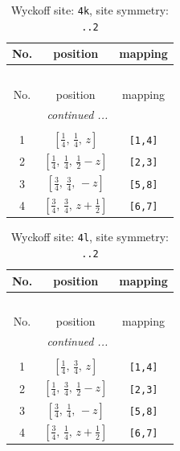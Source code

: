 \documentclass[fleqn,8pt]{jsarticle}
\begin{document}
\renewcommand{\arraystretch}{1.2}
\begin{longtable}{ccc}
\caption{Wyckoff site: {\tt 4k}, site symmetry: {\tt ..2}}
 \\
 \hline \hline
No. & position & mapping \\ \hline \endfirsthead

\multicolumn{2}{l}{\tablename\ \thetable{}} \\
 \hline \hline
No. & position & mapping \\ \hline \endhead

 \hline \hline
\multicolumn{2}{r}{\footnotesize\it continued ...} \\ \endfoot

 \hline \hline
\multicolumn{2}{r}{} \\ \endlastfoot

1 & $\left[ \frac{1}{4},\, \frac{1}{4},\, z \right]$ & {\tt [1,4]} \\ \hline
2 & $\left[ \frac{1}{4},\, \frac{1}{4},\, \frac{1}{2} - z \right]$ & {\tt [2,3]} \\ \hline
3 & $\left[ \frac{3}{4},\, \frac{3}{4},\, - z \right]$ & {\tt [5,8]} \\ \hline
4 & $\left[ \frac{3}{4},\, \frac{3}{4},\, z + \frac{1}{2} \right]$ & {\tt [6,7]} \\
\end{longtable}
\renewcommand{\arraystretch}{1.2}
\begin{longtable}{ccc}
\caption{Wyckoff site: {\tt 4l}, site symmetry: {\tt ..2}}
 \\
 \hline \hline
No. & position & mapping \\ \hline \endfirsthead

\multicolumn{2}{l}{\tablename\ \thetable{}} \\
 \hline \hline
No. & position & mapping \\ \hline \endhead

 \hline \hline
\multicolumn{2}{r}{\footnotesize\it continued ...} \\ \endfoot

 \hline \hline
\multicolumn{2}{r}{} \\ \endlastfoot

1 & $\left[ \frac{1}{4},\, \frac{3}{4},\, z \right]$ & {\tt [1,4]} \\ \hline
2 & $\left[ \frac{1}{4},\, \frac{3}{4},\, \frac{1}{2} - z \right]$ & {\tt [2,3]} \\ \hline
3 & $\left[ \frac{3}{4},\, \frac{1}{4},\, - z \right]$ & {\tt [5,8]} \\ \hline
4 & $\left[ \frac{3}{4},\, \frac{1}{4},\, z + \frac{1}{2} \right]$ & {\tt [6,7]} \\
\end{longtable}
\end{document}
